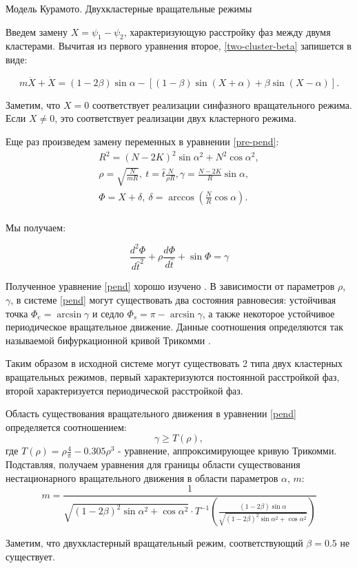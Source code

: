 \begin{chapter}{Модель Курамото. Двухкластерные вращательные режимы}
	
	Введем замену $X = \psi_1 - \psi_2$, характеризующую расстройку фаз между двумя кластерами.
	Вычитая из первого уравнения второе, \ref{two-cluster-beta} запишется в виде:
	
	\begin{equation} \label{pre-pend}
		m\ddot{X} + \dot{X} = (1 - 2 \beta) \sin{\alpha} - \left[(1-\beta)\sin{(X + \alpha)} + \beta\sin{(X - \alpha)} \right].
	\end{equation}
	
	Заметим, что $X = 0$ соответствует реализации
	синфазного вращательного режима. Если $X \neq 0$,
	это соответствует реализации двух кластерного режима. 
	
	Еще раз произведем замену переменных в уравнении \ref{pre-pend}:
	\begin{align*}
	R^2 = (N - 2K)^2 \sin{\alpha}^2 + N^2 \cos{\alpha}^2, \\
	\rho = \sqrt{\frac{N}{m R}}, \ t = \hat{t} \frac{N}{\rho R}, \gamma = \frac{N - 2K}{R}\sin{\alpha}, \\
	\Phi = X + \delta, \ \delta = \arccos{(\frac{N}{R}\cos{\alpha})}. \\
	\end{align*}
	
	Мы получаем:
	
	\begin{equation} \label{pend}
		\frac{d^2 \Phi }{d\hat{t}^2} + \rho \frac{d\Phi}{d\hat{t}} + \sin{\Phi} = \gamma
	\end{equation}

	Полученное уравнение \ref{pend} хорошо изучено \cite{Andronov:Vitt}. 
	В зависимости от параметров $\rho$, $\gamma$, в системе \ref{pend}
	могут существовать два состояния равновесия:
	устойчивая точка $\Phi_e = \arcsin{\gamma}$ и седло
	$\Phi_s = \pi - \arcsin{\gamma}$, а также
	некоторое устойчивое периодическое вращательное движение.
	Данные соотношения определяются так называемой
	бифуркационной кривой Трикомми \cite{Andronov:Vitt}.

	Таким образом в исходной системе могут существовать 2 типа
	двух кластерных вращательных режимов, первый характеризуются
	постоянной расстройкой фаз, второй характеризуется
	периодической расстройкой фаз.
	
	Область существования вращательного движения в уравнении \ref{pend}
	определяется соотношением:
	\begin{equation}
		\gamma \ge T(\rho),
	\end{equation}
	где $T(\rho) = \rho\frac{4}{\pi} - 0.305\rho^3$ - уравнение, аппроксимирующее кривую Трикомми.
	Подставляя, получаем уравнения для границы области существования нестационарного вращательного движения в области параметров
	$\alpha$, $m$:
	\begin{equation}
		m = \frac{1}{\sqrt{(1 - 2\beta)^2\sin{\alpha}^2 + \cos{\alpha}^2} \cdot T^{-1}(\frac{(1 - 2\beta)\sin{\alpha}}{\sqrt{(1 - 2\beta)^2\sin{\alpha}^2 + \cos{\alpha}^2}})}
	\end{equation}


	Заметим, что двухкластерный вращательный режим, соответствующий
	$\beta = 0.5$ не существует.


\end{chapter}